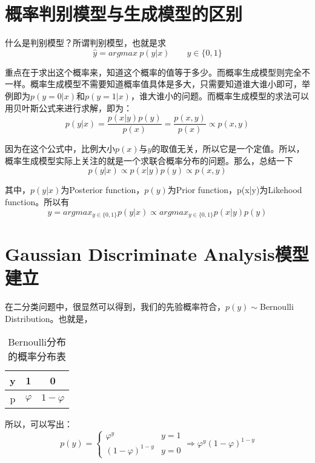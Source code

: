 \documentclass[a4paper]{article}
\begin{document}
\section{概率判别模型与生成模型的区别}
什么是判别模型？所谓判别模型，也就是求
\begin{equation}
    \hat{y} = argmax\ p(y|x) \qquad y\in\{0,1\}
\end{equation}

重点在于求出这个概率来，知道这个概率的值等于多少。而概率生成模型则完全不一样。概率生成模型不需要知道概率值具体是多大，只需要知道谁大谁小即可，举例即为$p(y=0|x)$和$p(y=1|x)$，谁大谁小的问题。而概率生成模型的求法可以用贝叶斯公式来进行求解，即为：
\begin{equation}
    p(y|x)=\frac{p(x|y)p(y)}{p(x)}=\frac{p(x,y)}{p(x)}\propto p(x,y)
\end{equation}

因为在这个公式中，比例大小$p(x)$与$y$的取值无关，所以它是一个定值。所以，概率生成模型实际上关注的就是一个求联合概率分布的问题。那么，总结一下
\begin{equation}
    p(y|x) \propto p(x|y)p(y) \propto p(x,y)
\end{equation}

其中，$p(y|x)$为Posterior function，$p(y)$为Prior function，p(x|y)为Likehood function。所以有
\begin{equation}
    \hat{y} = argmax_{y\in \{0,1\}}p(y|x) \propto argmax_{y\in \{0,1\}}p(x|y)p(y)
\end{equation}

\section{Gaussian Discriminate Analysis模型建立}
在二分类问题中，很显然可以得到，我们的先验概率符合，$p(y)\sim$Bernoulli Distribution。也就是，
\begin{table}[H]
    \centering
    \begin{tabular}{c|cc}
         y & 1 & 0 \\
         \hline
         p & $\varphi$ & $1-\varphi$ \\
    \end{tabular}
    \caption{Bernoulli分布的概率分布表}
    \label{tab:my_label}
\end{table}

所以，可以写出：
\begin{equation}
    p(y)=
    \left\{
        \begin{array}{ll}
            \varphi^y & y=1 \\
            (1-\varphi)^{1-y} & y=0
        \end{array}
    \right.
    \Rightarrow
    \varphi^y(1-\varphi)^{1-y}
\end{equation}
\end{document}
